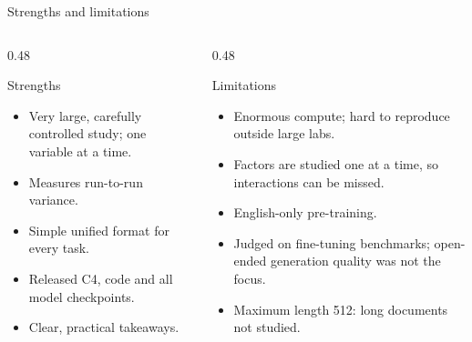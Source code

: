 \documentclass[aspectratio=169,11pt]{beamer}
\begin{document}
\begin{frame}{Strengths and limitations}
  \begin{columns}[T]
    \begin{column}{0.48\textwidth}
      \begin{exampleblock}{Strengths}
        \small
        \begin{itemize}
          \item Very large, carefully controlled study; one variable at a time.
          \item Measures run-to-run variance.
          \item Simple unified format for every task.
          \item Released C4, code and all model checkpoints.
          \item Clear, practical takeaways.
        \end{itemize}
      \end{exampleblock}
    \end{column}
    \begin{column}{0.48\textwidth}
      \begin{alertblock}{Limitations}
        \small
        \begin{itemize}
          \item Enormous compute; hard to reproduce outside large labs.
          \item Factors are studied one at a time, so interactions can be missed.
          \item English-only pre-training.
          \item Judged on fine-tuning benchmarks; open-ended generation quality was not the focus.
          \item Maximum length 512: long documents not studied.
        \end{itemize}
      \end{alertblock}
    \end{column}
  \end{columns}
\end{frame}
\end{document}
